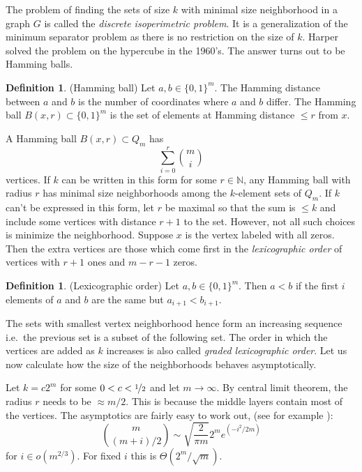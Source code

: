 \documentclass[a4paper,12pt]{book}
\theoremstyle{plain}
\theoremstyle{definition}
\newtheorem{definition}[theorem]{Definition}
\begin{document}
The problem of finding the sets of size $k$ with minimal size neighborhood in a graph $G$ is 
called the \textit{discrete isoperimetric problem}. It is a generalization of 
the minimum separator problem as there is no restriction on the size of $k$. 
Harper \cite{Harp} solved the problem on the hypercube in the 1960's. The 
answer turns out to be Hamming balls.

\begin{definition}
 (Hamming ball) Let $a,b \in \{0,1\}^m$. The Hamming distance between $a$ and 
$b$ is the number of coordinates where $a$ and $b$ differ. The Hamming ball 
$B(x,r) \subset \{0,1\}^m$ is the set of elements at Hamming distance $\leq r$ from $x$.
\end{definition}

A Hamming ball $B(x,r) \subset Q_m$ has 
\begin{equation}
 \sum_{i=0}^r {m \choose i}
\end{equation}
vertices. If $k$ can be written in this form for some $r \in \mathbb{N}$, any Hamming ball with radius $r$ has minimal size neighborhoods 
among the $k$-element sets of $Q_m$. 
If $k$ can't be expressed in this form, let $r$ be maximal so that 
the sum is $\leq k$ and include some vertices with distance $r+1$ to the set. 
However, not all such choices is minimize the neighborhood. Suppose $x$ is the vertex labeled with 
all zeros. Then the extra vertices are those which come first in the
\textit{lexicographic order} of vertices with $r+1$ ones and $m-r-1$ zeros.
\begin{definition}
 (Lexicographic order) Let $a,b \in \{0,1\}^m$. Then $a<b$ if the first $i$ 
elements of $a$ and $b$ are the same but $a_{i+1} < b_{i+1}$.
\end{definition}
The sets with smallest vertex neighborhood hence form an increasing sequence i.e.\ 
the previous set is a subset of the following set. The order in which the 
vertices are added as $k$ increases is also called \textit{graded lexicographic 
order}. Let us now calculate how the size of the neighborhoods behaves asymptotically.

Let $k = c2^m$ for some $0<c<\nicefrac{1}{2}$ and let $m \rightarrow \infty$. By central limit theorem, 
the radius $r$ needs to be $\approx m/2$. This is because the middle layers contain most of the vertices.
The asymptotics are fairly easy to work out, (see for example \cite{Spencer:Asymptopia}):
\begin{equation}
\binom{m}{(m+i)/2} \sim \sqrt{\frac{2}{\pi m}} 2^m e^{\left(-i^2/2m\right)}  
\end{equation}
for $i \in o(m^{2/3})$. For fixed $i$ this is $\Theta(2^m/\sqrt{m})$.
\end{document}
